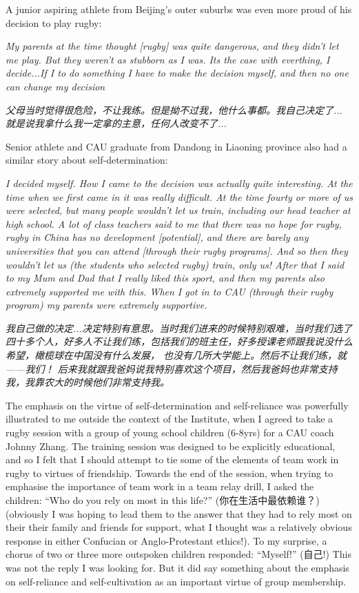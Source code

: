 A junior aspiring athlete from Beijing's outer suburbs was even more proud of his decision to play rugby:

\textit{My parents at the time thought [rugby] was quite dangerous, and they didn't let me play.  But they weren't as stubborn as I was.  Its the case with everthing, I decide...If I to do something I have to make the decision myself, and then no one can change my decision}

\textit{父母当时觉得很危险，不让我练。但是拗不过我，他什么事都。我自己决定了...
就是说我拿什么我一定拿的主意，任何人改变不了...}

Senior athlete and CAU graduate from Dandong in Liaoning province also had a similar story about self-determination:

\textit{I decided myself. How I came to the decision was actually quite interesting.  At the time when we first came in it was really difficult.  At the time fourty or more of us were selected, but many people wouldn't let us train, including our head teacher at high school.  A lot of class teachers said to me that there was no hope for rugby, rugby in China has no development [potential], and there are barely any universities that you can attend [through their rugby programs].  And so then they wouldn't let us (the students who selected rugby) train, only us! After that I said to my Mum and Dad that I really liked this sport, and then my parents also extremely supported me with this.  When I got in to CAU (through their rugby program) my parents were extremely supportive.}

\textit{我自己做的决定...决定特别有意思。当时我们进来的时候特别艰难，当时我们选了四十多个人，好多人不让我们练，包括我们的班主任，好多授课老师跟我说没什么希望，橄榄球在中国没有什么发展， 也没有几所大学能上。然后不让我们练，就——我们！ 后来我就跟我爸妈说我特别喜欢这个项目，然后我爸妈也非常支持我，我靠农大的时候他们非常支持我。} 

The emphasis on the virtue of self-determination and self-reliance was powerfully illustrated to me outside the context of the Institute, when I agreed to take a rugby session with a group of young school children (6-8yrs) for a CAU coach Johnny Zhang.  The training session was designed to be explicitly educational, and so I felt that I should attempt to tie some of the elements of team work in rugby to virtues of friendship.  Towards the end of the session, when trying to emphasise the importance of team work in a team relay drill, I asked the children: ``Who do you rely on most in this life?'' (你在生活中最依赖谁？)(obviously I was hoping to lead them to the answer that they had to rely most on their their family and friends for support, what I thought was a relatively obvious response in either Confucian or Anglo-Protestant ethics!).  To my surprise, a chorus of two or three more outspoken children responded: ``Myself!'' (自己!) This was not the reply I was looking for. But it did say something about the emphasis on self-reliance and self-cultivation as an important virtue of group membership.

